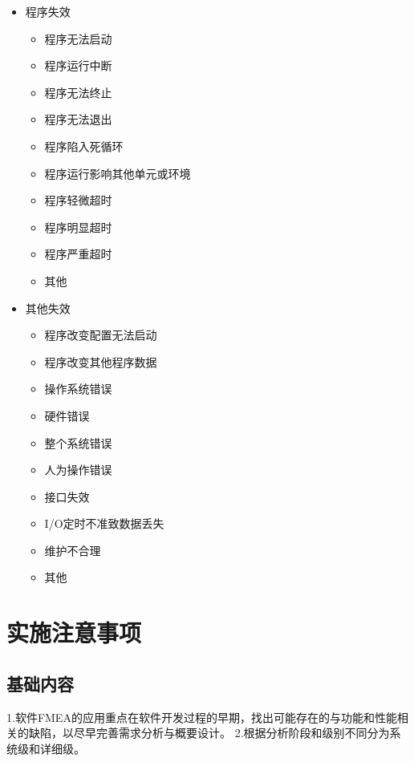 \begin{multicols}{2}
\begin{itemize}
\begin{itemize}
        \item 程序失效
        \begin{itemize}
            \item 程序无法启动
            \item 程序运行中断
            \item 程序无法终止
            \item 程序无法退出
            \item 程序陷入死循环
            \item 程序运行影响其他单元或环境
            \item 程序轻微超时
            \item 程序明显超时
            \item 程序严重超时
            \item 其他
        \end{itemize}

        \item 其他失效
        \begin{itemize}
            \item 程序改变配置无法启动
            \item 程序改变其他程序数据
            \item 操作系统错误
            \item 硬件错误
            \item 整个系统错误
            \item 人为操作错误
            \item 接口失效
            \item I/O定时不准致数据丢失
            \item 维护不合理
            \item 其他
        \end{itemize}
    \end{itemize}
\end{itemize}
\end{multicols}

\section{实施注意事项}

\subsection{基础内容}

1.软件FMEA的应用重点在软件开发过程的早期，找出可能存在的与功能和性能相关的缺陷，以尽早完善需求分析与概要设计。
2.根据分析阶段和级别不同分为系统级和详细级。

